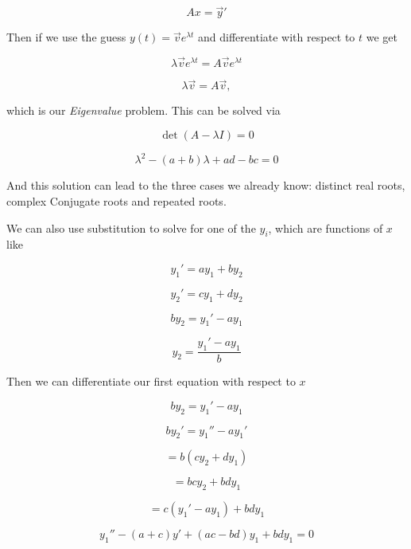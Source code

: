 \[
Ax = \vec{y}'
\]

Then if we use the guess \(y(t) = \vec{v} e^{\lambda t}\) and differentiate with respect to \(t\) 
we get 

\[
 \lambda \vec{v} e^{\lambda t} = A \vec{v} e^{\lambda t}
\]

\[
 \lambda \vec{v} = A \vec{v},
\]

which is our \emph{Eigenvalue} problem. This can be solved via

\[
\det(A - \lambda I) = 0
\]

\[
\lambda^{2} - (a + b)\lambda + ad - bc = 0
\]

And this solution can lead to the three cases we already know: distinct real roots, complex Conjugate 
roots and repeated roots.
\vspace{\baselineskip}

We can also use substitution to solve for one of the \(y_i\), which are functions of \(x\) like

\[
y_1 ' = ay_1 + by_2
\]

\[
y_2 ' = cy_1 + dy_2
\]

\[
by_2 = y_1' - ay_1
\]

\[
y_2 = \frac{y_1' - ay_1}{b}
\]

Then we can differentiate our first equation with respect to \(x\)

\[
by_2 = y_1' - ay_1
\]

\[
by_2' = y_1'' - ay_1'
\]

\[
= b (cy_2 + dy_1)
\]

\[
= bcy_2 + bdy_1
\]


\[
= c (y_1' -ay_1 ) + bdy_1
\]

\[
y_1'' - (a + c)y' + (ac - bd)y_1 + bdy_1 = 0
\]














